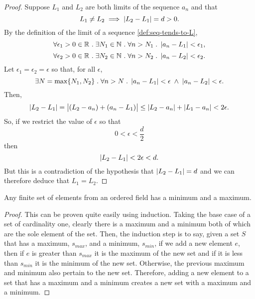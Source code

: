 \documentclass[../MathsNotesBase.tex]{subfiles}
\begin{document}
{		
		
			
		\bigskip	
		\begin{proof}
			Suppose $L_1$ and $L_2$ are both limits of the sequence $a_n$ and that
			\[  L_1 \neq L_2 \implies \left\lvert L_2 - L_1\right\rvert = d > 0. \]
			By the definition of the limit of a sequence \ref{def:seq-tends-to-L},
			\[ \forall \epsilon_1 > 0 \in \mathbb{R}^{} \;.\; \exists N_1 \in \mathbb{N}^{} \;.\; \forall n > N_1 \;.\; \left\lvert a_n - L_1\right\rvert < \epsilon_1, \]
			\[ \forall \epsilon_2 > 0 \in \mathbb{R}^{} \;.\; \exists N_2 \in \mathbb{N}^{} \;.\; \forall n > N_2 \;.\; \left\lvert a_n - L_2\right\rvert < \epsilon_2. \]
			Let ${ \epsilon_1 = \epsilon_2 = \epsilon }$ so that, for all $\epsilon$,
			\[ \exists N = \max \{ N_1, N_2 \} \;.\; \forall n > N \;.\; \left\lvert a_n - L_1\right\rvert < \epsilon \; \land \; \left\lvert a_n - L_2\right\rvert < \epsilon. \]
			Then,
			\[ \left\lvert L_2 - L_1\right\rvert = \left\lvert(L_2 - a_n) + (a_n - L_1)\right\rvert \leq \left\lvert L_2 - a_n\right\rvert + \left\lvert L_1 - a_n\right\rvert < 2\epsilon. \]	
			So, if we restrict the value of $\epsilon$ so that
			\[ 0 < \epsilon < \frac{d}{2} \]
			then
			\[ \left\lvert L_2 - L_1\right\rvert < 2\epsilon < d. \]
			But this is a contradiction of the hypothesis that ${ \left\lvert L_2 - L_1\right\rvert = d }$ and we can therefore deduce that ${ L_1 = L_2 }$.
		\end{proof}	
		
		\bigskip
		\begin{lemma}
			Any finite set of elements from an ordered field has a minimum and a maximum.
		\end{lemma}
		\begin{proof}
			This can be proven quite easily using induction. Taking the base case of a set of cardinality one, clearly there is a maximum and a minimum both of which are the sole element of the set. Then, the induction step is to say, given a set $S$ that has a maximum, $s_{max}$, and a minimum, $s_{min}$, if we add a new element $e$, then if $e$ is greater than $s_{max}$ it is the maximum of the new set and if it is less than $s_{min}$ it is the minimum of the new set. Otherwise, the previous maximum and minimum also pertain to the new set. Therefore, adding a new element to a set that has a maximum and a minimum creates a new set with a maximum and a minimum.
		\end{proof}
	
}
\end{document}
